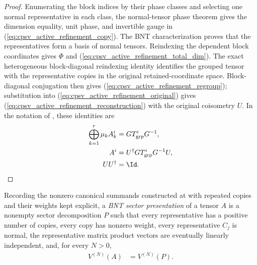 \begin{proof}\leanok
    Enumerating the block indices by their phase classes and selecting one
    normal representative in each class, the normal-tensor phase theorem gives
    the dimension equality, unit phase, and invertible gauge in
    (\ref{eq:cpsv_active_refinement_copy}). The BNT characterization proves
    that the representatives form a basis of normal tensors. Reindexing the
    dependent block coordinates gives $\Phi$ and
    (\ref{eq:cpsv_active_refinement_total_dim}). The exact heterogeneous
    block-diagonal reindexing identity identifies the grouped tensor with the
    representative copies in the original retained-coordinate space.
    Block-diagonal conjugation then gives
    (\ref{eq:cpsv_active_refinement_regroup}); substitution into
    (\ref{eq:cpsv_active_refinement_original}) gives
    (\ref{eq:cpsv_active_refinement_reconstruction}) with the original
    coisometry $U$. In the notation of
    \cite[Proposition~4.13]{Cirac2016MPDO_arXiv}, these identities
    are
    \begin{align}
        \bigoplus_{k=1}^{r}\mu_kA_k^i
         & =GT_{\mathrm{grp}}^iG^{-1},
        \label{eq:cpsv_prop_4_13_active_bnt}            \\
        A^i
         & =U^\dagger GT_{\mathrm{grp}}^iG^{-1}U,
        \label{eq:cpsv_prop_4_13_active_reconstruction} \\
        UU^\dagger
         & =\Id.
        \label{eq:cpsv_prop_4_13_original_coisometry}
    \end{align}
\end{proof}

\begin{definition}
    \label{def:cpsv_bnt_sector_presentation}
    \leanok
    Recording the nonzero canonical summands constructed at
    \cite[lines~217--246]{Cirac2016MPDO_arXiv} with repeated copies and their
    weights kept explicit, a \emph{BNT sector presentation} of a tensor $A$ is
    a nonempty sector decomposition $P$ such that every representative has a
    positive number of copies, every copy has nonzero weight, every
    representative $C_j$ is normal, the representative matrix product vectors
    are eventually linearly independent, and, for every $N>0$,
    \begin{align}
        V^{(N)}(A) & =V^{(N)}(P).
        \label{eq:cpsv_active_bnt_sector_presentation}
    \end{align}
\end{definition}

